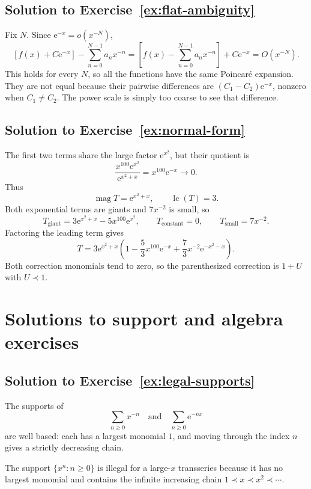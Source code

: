 \documentclass[11pt,oneside]{book}
\theoremstyle{definition}
\theoremstyle{remark}
\newcommand{\magop}{\operatorname{mag}}
\newcommand{\lc}{\operatorname{lc}}
\newcommand{\e}{\mathrm{e}}
\newcommand{\smallo}{o}
\newcommand{\bigO}{O}
\newcommand{\precdom}{\prec}
\begin{document}
\subsection*{Solution to Exercise~\ref{ex:flat-ambiguity}}

Fix $N$. Since $\e^{-x}=\smallo(x^{-N})$,
\[
  \left[f(x)+C\e^{-x}\right]
  -\sum_{n=0}^{N-1}a_nx^{-n}
  =\left[f(x)-\sum_{n=0}^{N-1}a_nx^{-n}\right]
   +C\e^{-x}
  =\bigO(x^{-N}).
\]
This holds for every $N$, so all the functions have the same Poincar\'e
expansion. They are not equal because their pairwise differences are
$(C_1-C_2)\e^{-x}$, nonzero when $C_1\ne C_2$. The power scale is simply too
coarse to see that difference.

\subsection*{Solution to Exercise~\ref{ex:normal-form}}

The first two terms share the large factor $\e^{x^2}$, but their quotient is
\[
  \frac{x^{100}\e^{x^2}}{\e^{x^2+x}}
  =x^{100}\e^{-x}\to0.
\]
Thus
\[
  \magop T=\e^{x^2+x},
  \qquad\lc(T)=3.
\]
Both exponential terms are giants and $7x^{-2}$ is small, so
\[
  T_{\mathrm{giant}}
   =3\e^{x^2+x}-5x^{100}\e^{x^2},
  \qquad T_{\mathrm{constant}}=0,
  \qquad T_{\mathrm{small}}=7x^{-2}.
\]
Factoring the leading term gives
\[
  T=3\e^{x^2+x}
  \left(
    1-\frac53x^{100}\e^{-x}
      +\frac73x^{-2}\e^{-x^2-x}
  \right).
\]
Both correction monomials tend to zero, so the parenthesized correction is
$1+U$ with $U\precdom1$.

\section{Solutions to support and algebra exercises}

\subsection*{Solution to Exercise~\ref{ex:legal-supports}}

The supports of
\[
  \sum_{n\ge0}x^{-n}
  \quad\text{and}\quad
  \sum_{n\ge0}\e^{-nx}
\]
are well based: each has a largest monomial $1$, and moving through the index
$n$ gives a strictly decreasing chain.

The support $\{x^n:n\ge0\}$ is illegal for a large-$x$ transseries because it has
no largest monomial and contains the infinite increasing chain
$1\precdom x\precdom x^2\precdom\cdots$.
\end{document}
